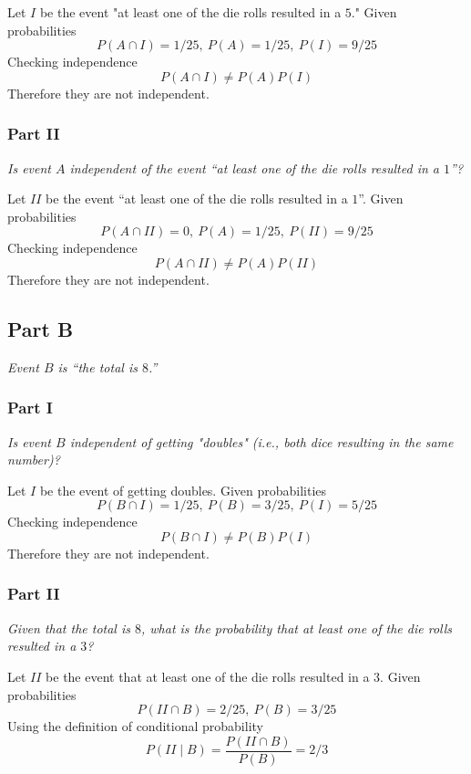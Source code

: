 \documentclass{article}
\begin{document}
\bigbreak

Let $ I $ be the event "at least one of the die rolls resulted in a $ 5 $."
Given probabilities
$$ P(A \cap I) = 1/25,\ P(A) = 1/25,\ P(I) = 9/25 $$
Checking independence
$$ P(A \cap I) \neq P(A) P(I) $$
Therefore they are not independent.

\subsubsection*{Part II}

\textit{Is event $ A $ independent of the event “at least one of the die rolls
resulted in a $ 1 $”?}

\bigbreak

Let $ II $ be the event “at least one of the die rolls resulted in a $ 1 $”.
Given probabilities
$$ P(A \cap II) = 0,\ P(A) = 1/25,\ P(II) = 9/25 $$
Checking independence
$$ P(A \cap II) \neq P(A) P(II) $$
Therefore they are not independent.

\subsection*{Part B}

\textit{Event $ B $ is “the total is $ 8 $.”}

\subsubsection*{Part I}

\textit{Is event $ B $ independent of getting "doubles" (i.e., both dice
resulting in the same number)?}

\bigbreak

Let $ I $ be the event of getting doubles. Given probabilities
$$ P(B \cap I) = 1/25,\ P(B) = 3/25,\ P(I) = 5/25 $$
Checking independence
$$ P(B \cap I) \neq P(B) P(I) $$
Therefore they are not independent.

\subsubsection*{Part II}

\textit{Given that the total is $ 8 $, what is the probability that at least one
of the die rolls resulted in a $ 3 $?}

\bigbreak

Let $ II $ be the event that at least one of the die rolls resulted in a $ 3 $.
Given probabilities
$$ P(II \cap B) = 2/25,\ P(B) = 3/25 $$
Using the definition of conditional probability
$$ P(II \mid B) = \frac{P(II \cap B)}{P(B)} = 2/3 $$
\end{document}
